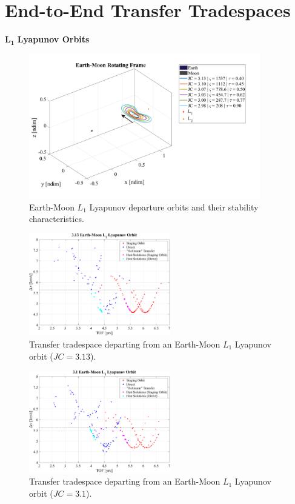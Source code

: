 \chapter{End-to-End Transfer Tradespaces}

$\pmb{L_{1}}$ \textbf{Lyapunov Orbits}
\begin{figure}[ht]
    \centering
    \includegraphics[width=0.9\textwidth]{figures/L1LyapunovDepartureOrbits.pdf}
    \caption{Earth-Moon $L_{1}$ Lyapunov departure orbits and their stability characteristics.}
\end{figure}
\clearpage

\begin{figure}[ht]
    \centering
    \includegraphics[width=0.55\textwidth]{figures/TradeSpace_L1Lyapunov_3_13.pdf}
    \caption{Transfer tradespace departing from an Earth-Moon $L_{1}$ Lyapunov orbit ($JC=3.13$).}
\end{figure}

\begin{figure}[ht]
    \centering
    \includegraphics[width=0.55\textwidth]{figures/TradeSpace_L1Lyapunov_3_10.pdf}
    \caption{Transfer tradespace departing from an Earth-Moon $L_{1}$ Lyapunov orbit ($JC=3.1$).}
\end{figure}
\clearpage

